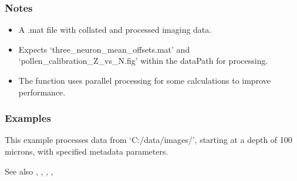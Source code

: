 \documentclass[letterpaper,10pt,english]{sphinxmanual}
\begin{document}
\begin{fulllineitems}
\begin{quote}
\begin{description}
\end{description}\end{quote}
\subsubsection*{Notes}
\begin{itemize}
\item {} 
\sphinxAtStartPar
A .mat file with collated and processed imaging data.

\item {} 
\sphinxAtStartPar
Expects ‘three\_neuron\_mean\_offsets.mat’ and ‘pollen\_calibration\_Z\_vs\_N.fig’
within the dataPath for processing.

\item {} 
\sphinxAtStartPar
The function uses parallel processing for some calculations to improve
performance.

\end{itemize}
\subsubsection*{Examples}
\begin{description}
\sphinxAtStartPar
This example processes data from ‘C:/data/images/’, starting at a depth of 100 microns,
with specified metadata parameters.

\end{description}

\sphinxAtStartPar
See also , , , , 

\end{fulllineitems}

\end{document}
